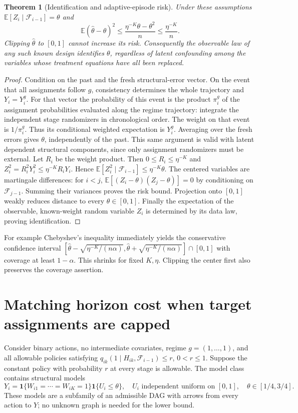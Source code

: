 \documentclass[11pt]{article}
\newtheorem{theorem}{Theorem}
\theoremstyle{remark}
\newcommand{\E}{\mathbb E}
\newcommand{\Ind}{\mathbf 1}
\begin{document}
\begin{theorem}[Identification and adaptive-episode risk]
Under these assumptions $\E[Z_i\mid\mathcal F_{i-1}]=\theta$ and
\[
 \E(\widehat\theta-\theta)^2
 \leq \frac{\eta^{-K}\theta-\theta^2}{n}
 \leq\frac{\eta^{-K}}n.
\]
Clipping $\widehat\theta$ to $[0,1]$ cannot increase its risk.
Consequently the observable law of any such known design identifies
$\theta$, regardless of latent confounding among the variables whose
treatment equations have all been replaced.
\end{theorem}
\begin{proof}
Condition on the past and the fresh structural-error vector. On the event
that all assignments follow $g$, consistency determines the whole
trajectory and $Y_i=Y_i^g$. For that vector the probability of this event
is the product $\pi_i^g$ of the assignment probabilities evaluated along
the regime trajectory: integrate the independent stage randomizers in
chronological order. The weight on that event is $1/\pi_i^g$.
Thus its conditional weighted expectation is $Y_i^g$. Averaging over
the fresh errors gives $\theta$, independently of the past. This same
argument is valid with latent dependent structural components, since only
assignment randomizers must be external.
Let $R_i$ be the weight product. Then $0\leq R_i\leq\eta^{-K}$ and
$Z_i^2=R_i^2Y_i^2\leq\eta^{-K}R_iY_i$.
Hence $\E[Z_i^2\mid\mathcal F_{i-1}]\leq\eta^{-K}\theta$.
The centered variables are martingale differences: for $i<j$,
$\E[(Z_i-\theta)(Z_j-\theta)]=0$ by conditioning on $\mathcal F_{j-1}$.
Summing their variances proves the risk bound. Projection onto $[0,1]$
weakly reduces distance to every $\theta\in[0,1]$. Finally the expectation
of the observable, known-weight random variable $Z_i$ is determined by
its data law, proving identification.
\end{proof}

For example Chebyshev's inequality immediately yields the conservative
confidence interval
$[\widehat\theta-\sqrt{\eta^{-K}/(n\alpha)},
\widehat\theta+\sqrt{\eta^{-K}/(n\alpha)}]\cap[0,1]$
with coverage at least $1-\alpha$. This shrinks for fixed $K,\eta$.
Clipping the center first also preserves the coverage assertion.

\section{Matching horizon cost when target assignments are capped}
Consider binary actions, no intermediate covariates, regime
$g=(1,\ldots,1)$, and all allowable policies satisfying
$q_{ik}(1\mid H_{ik},\mathcal F_{i-1})\leq r$, $0<r\leq1$.
Suppose the constant policy with probability $r$ at every stage is
allowable. The model class contains structural models
\[
 Y_i=\Ind\{W_{i1}=\cdots=W_{iK}=1\}\Ind\{U_i\leq\theta\},
 \quad U_i\text{ independent uniform on }[0,1],\quad
 \theta\in[1/4,3/4].
\]
These models are a subfamily of an admissible DAG with arrows from every
action to $Y$; no unknown graph is needed for the lower bound.
\end{document}

